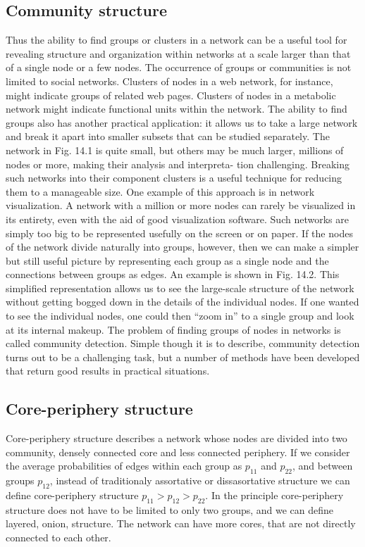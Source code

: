 \subsection{Community structure}

Thus the ability to find groups or clusters in a network can be a useful tool for revealing structure and organization within networks at a scale larger than that of a single node or a
few nodes. The occurrence of groups or communities is not limited to social networks.
Clusters of nodes in a web network, for instance, might indicate groups of
related web pages. Clusters of nodes in a metabolic network might indicate
functional units within the network. The ability to find groups also has another practical application: it allows
us to take a large network and break it apart into smaller subsets that can be
studied separately. The network in Fig. 14.1 is quite small, but others may be
much larger, millions of nodes or more, making their analysis and interpreta-
tion challenging. Breaking such networks into their component clusters is a
useful technique for reducing them to a manageable size. One example of this
approach is in network visualization. A network with a million or more nodes
can rarely be visualized in its entirety, even with the aid of good visualization
software. Such networks are simply too big to be represented usefully on the
screen or on paper. If the nodes of the network divide naturally into groups,
however, then we can make a simpler but still useful picture by representing
each group as a single node and the connections between groups as edges.
An example is shown in Fig. 14.2. This simplified representation allows us to
see the large-scale structure of the network without getting bogged down in
the details of the individual nodes. If one wanted to see the individual nodes,
one could then “zoom in” to a single group and look at its internal makeup. The problem of finding groups of nodes in networks is called community
detection. Simple though it is to describe, community detection turns out to be
a challenging task, but a number of methods have been developed that return
good results in practical situations. %

\subsection{Core-periphery structure}

Core-periphery structure describes a network whose nodes are divided into two community, densely connected core and less connected periphery. If we consider the average probabilities of edges within each group as $p_{11}$ and $p_{22}$, and between groups $p_{12}$, instead of traditionaly assortative or dissasortative structure we can define core-periphery structure $p_{11}> p_{12} > p_{22}$. In the principle core-periphery structure does not have to be limited to only two groups, and we can define layered, onion, structure. The network can have more cores, that are not directly connected to each other. 

